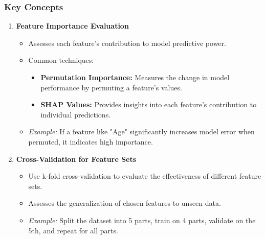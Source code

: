 \documentclass[aspectratio=169]{beamer}
\begin{document}
\begin{frame}[fragile]
    \frametitle{Key Concepts}
    \begin{enumerate}
        \item \textbf{Feature Importance Evaluation}
            \begin{itemize}
                \item Assesses each feature's contribution to model predictive power.
                \item Common techniques:
                    \begin{itemize}
                        \item \textbf{Permutation Importance:} Measures the change in model performance by permuting a feature's values.
                        \item \textbf{SHAP Values:} Provides insights into each feature's contribution to individual predictions.
                    \end{itemize}
                \item \textit{Example:} If a feature like "Age" significantly increases model error when permuted, it indicates high importance.
            \end{itemize}
        
        \item \textbf{Cross-Validation for Feature Sets}
            \begin{itemize}
                \item Use k-fold cross-validation to evaluate the effectiveness of different feature sets.
                \item Assesses the generalization of chosen features to unseen data.
                \item \textit{Example:} Split the dataset into 5 parts, train on 4 parts, validate on the 5th, and repeat for all parts.
            \end{itemize}


\end{enumerate}
\end{frame}
\end{document}

